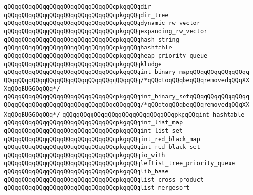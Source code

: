 \verb|qQQqqQQqqQQqqQQqqQQqqQQqqQQqqQQqpkgqQQqdir|\newline
\verb|qQQqqQQqqQQqqQQqqQQqqQQqqQQqqQQqpkgqQQqdir_tree|\newline
\verb|qQQqqQQqqQQqqQQqqQQqqQQqqQQqqQQqpkgqQQqdynamic_rw_vector|\newline
\newline
\verb|qQQqqQQqqQQqqQQqqQQqqQQqqQQqqQQqpkgqQQqexpanding_rw_vector|\newline
\newline
\newline
\newline
\newline
\verb|qQQqqQQqqQQqqQQqqQQqqQQqqQQqqQQqpkgqQQqhash_string|\newline
\verb|qQQqqQQqqQQqqQQqqQQqqQQqqQQqqQQqpkgqQQqhashtable|\newline
\verb|qQQqqQQqqQQqqQQqqQQqqQQqqQQqqQQqpkgqQQqheap_priority_queue|\newline
\verb|qQQqqQQqqQQqqQQqqQQqqQQqqQQqqQQqpkgqQQqkludge|\newline
\verb|qQQqqQQqqQQqqQQqqQQqqQQqqQQqqQQqpkgqQQqint_binary_mapqQQqqQQqqQQqqQQqqQQqqQQqqQQqqQQqqQQqqQQqqQQqqQQqqQQqqQQq/*qQQqtoqQQqbeqQQqremovedqQQqXXXqQQqBUGGOqQQq*/|\newline
\verb|qQQqqQQqqQQqqQQqqQQqqQQqqQQqqQQqpkgqQQqint_binary_setqQQqqQQqqQQqqQQqqQQqqQQqqQQqqQQqqQQqqQQqqQQqqQQqqQQqqQQq/*qQQqtoqQQqbeqQQqremovedqQQqXXXqQQqBUGGOqQQq*/|\newline
\verb|qQQqqQQqqQQqqQQqqQQqqQQqqQQqqQQqpkgqQQqint_hashtable|\newline
\verb|qQQqqQQqqQQqqQQqqQQqqQQqqQQqqQQqpkgqQQqint_list_map|\newline
\verb|qQQqqQQqqQQqqQQqqQQqqQQqqQQqqQQqpkgqQQqint_list_set|\newline
\verb|qQQqqQQqqQQqqQQqqQQqqQQqqQQqqQQqpkgqQQqint_red_black_map|\newline
\verb|qQQqqQQqqQQqqQQqqQQqqQQqqQQqqQQqpkgqQQqint_red_black_set|\newline
\verb|qQQqqQQqqQQqqQQqqQQqqQQqqQQqqQQqpkgqQQqio_with|\newline
\verb|qQQqqQQqqQQqqQQqqQQqqQQqqQQqqQQqpkgqQQqleftist_tree_priority_queue|\newline
\verb|qQQqqQQqqQQqqQQqqQQqqQQqqQQqqQQqpkgqQQqlib_base|\newline
\verb|qQQqqQQqqQQqqQQqqQQqqQQqqQQqqQQqpkgqQQqlist_cross_product|\newline
\verb|qQQqqQQqqQQqqQQqqQQqqQQqqQQqqQQqpkgqQQqlist_mergesort|\newline
